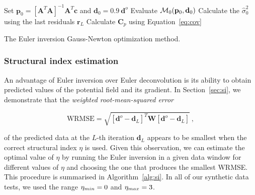 \begin{algorithm}[!htb]
  Set
  $\mathbf{p}_0 = \left[\mathbf{A}^T\mathbf{A}\right]^{-1}\mathbf{A}^T\mathbf{c}$
  and $\mathbf{d}_0 = 0.9\ \mathbf{d}^o$
  \;
  Evaluate $\operatorname{\mathcal{M}}_0(\mathbf{p}_0, \mathbf{d}_0)$
  \;
  Calculate the $\hat{\sigma}_0^2$ using the last residuals $\mathbf{r}_L$
  \;
  Calculate $\mathbf{C}_p$ using Equation~\ref{eq:cov}
  \;
  \BlankLine
  \caption{The Euler inversion Gauss-Newton optimization method.}
  \label{alg:ei}
\end{algorithm}

\subsubsection{Structural index estimation}

An advantage of Euler inversion over Euler deconvolution is its ability to obtain
predicted values of the potential field and its gradient.
In Section~\ref{sec:si}, we demonstrate that the \textit{weighted root-mean-squared error}

\begin{equation}
    \text{WRMSE} = \sqrt{\left[\mathbf{d}^o - \mathbf{d}_L\right]^T\mathbf{W}\left[\mathbf{d}^o - \mathbf{d}_L\right]} \ ,
    \label{eq:wrmse}
\end{equation}

\noindent
of the predicted data at the $L$-th iteration $\mathbf{d}_L$
appears to be smallest when the correct structural index $\eta$ is used.
Given this observation, we can estimate the optimal value of $\eta$ by running
the Euler inversion in a given data window for different values of $\eta$ and
choosing the one that produces the smallest WRMSE.
This procedure is summarised in Algorithm~\ref{alg:si}.
In all of our synthetic data tests, we used the range $\eta_{min}
= 0$ and $\eta_{max} = 3$.

